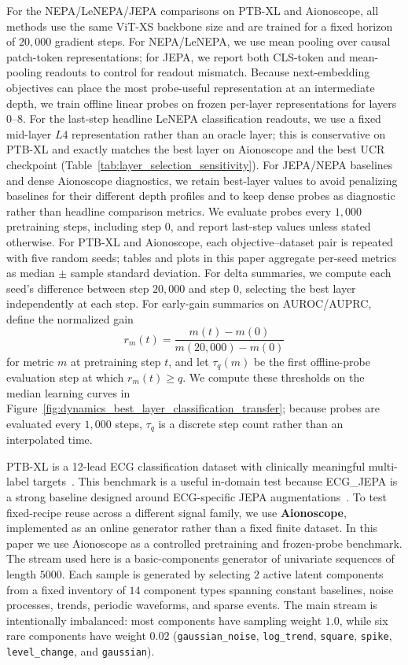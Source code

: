 \documentclass[sigconf,anonymous,review]{acmart}
\begin{document}
For the NEPA/LeNEPA/JEPA comparisons on PTB-XL and Aionoscope, all methods use the same ViT-XS backbone size and are trained for a fixed horizon of $20{,}000$ gradient steps.
For NEPA/LeNEPA, we use mean pooling over causal patch-token representations; for JEPA, we report both CLS-token and mean-pooling readouts to control for readout mismatch.
Because next-embedding objectives can place the most probe-useful representation at an intermediate depth, we train offline linear probes on frozen per-layer representations for layers $0$--$8$.
For the last-step headline LeNEPA classification readouts, we use a fixed mid-layer $L4$ representation rather than an oracle layer; this is conservative on PTB-XL and exactly matches the best layer on Aionoscope and the best UCR checkpoint (Table~\ref{tab:layer_selection_sensitivity}).
For JEPA/NEPA baselines and dense Aionoscope diagnostics, we retain best-layer values to avoid penalizing baselines for their different depth profiles and to keep dense probes as diagnostic rather than headline comparison metrics.
We evaluate probes every $1{,}000$ pretraining steps, including step $0$, and report last-step values unless stated otherwise.
For PTB-XL and Aionoscope, each objective--dataset pair is repeated with five random seeds; tables and plots in this paper aggregate per-seed metrics as median $\pm$ sample standard deviation.
For delta summaries, we compute each seed's difference between step $20{,}000$ and step $0$, selecting the best layer independently at each step.
For early-gain summaries on AUROC/AUPRC, define the normalized gain
\begin{equation}
  r_m(t)=\frac{m(t)-m(0)}{m(20{,}000)-m(0)}
\end{equation}
for metric $m$ at pretraining step $t$, and let $\tau_q(m)$ be the first offline-probe evaluation step at which $r_m(t)\ge q$.
We compute these thresholds on the median learning curves in Figure~\ref{fig:dynamics_best_layer_classification_transfer}; because probes are evaluated every $1{,}000$ steps, $\tau_q$ is a discrete step count rather than an interpolated time.

PTB-XL is a 12-lead ECG classification dataset with clinically meaningful multi-label targets~\citep{wagner2020ptbxl}.
This benchmark is a useful in-domain test because ECG\_JEPA is a strong baseline designed around ECG-specific JEPA augmentations~\citep{weimann2024jepaecg}.
To test fixed-recipe reuse across a different signal family, we use \textbf{Aionoscope}, implemented as an online generator rather than a fixed finite dataset.
In this paper we use Aionoscope as a controlled pretraining and frozen-probe benchmark.
The stream used here is a basic-components generator of univariate sequences of length $5000$.
Each sample is generated by selecting $2$ active latent components from a fixed inventory of $14$ component types spanning constant baselines, noise processes, trends, periodic waveforms, and sparse events.
The main stream is intentionally imbalanced: most components have sampling weight $1.0$, while six rare components have weight $0.02$ (\texttt{gaussian\_noise}, \texttt{log\_trend}, \texttt{square}, \texttt{spike}, \texttt{level\_change}, and \texttt{gaussian}).
\end{document}
